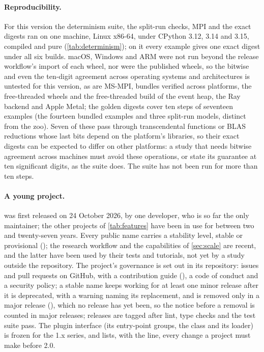 \paragraph{Reproducibility.} For this version the determinism suite, the split-run checks,
MPI and the exact digests ran on one machine, Linux x86-64, under CPython 3.12, 3.14 and
3.15, compiled and pure (\cref{tab:determinism}); on it every example gives one exact digest
under all six builds. macOS, Windows and ARM were not run beyond the release workflow's
import of each wheel, nor were the published wheels, so the bitwise and even the ten-digit
agreement across operating systems and architectures is untested for this version, as are
MS-MPI, bundles verified across platforms, the free-threaded wheels and the free-threaded
build of the event heap, the Ray backend and Apple Metal; the golden digests cover ten
steps of seventeen examples (the fourteen bundled examples and three split-run models,
distinct from the zoo). Seven of these pass through transcendental functions or BLAS
reductions whose last bits depend on the platform's libraries, so their exact digests can
be expected to differ on other platforms: a study that needs bitwise agreement across
machines must avoid these operations, or state its guarantee at ten significant digits, as
the suite does. The suite has not been run for more than ten steps.

\paragraph{A young project.} \modelly{} was first released on 24 October 2026, by one developer,
who is so far the only maintainer; the other projects of \cref{tab:features} have been in use
for between two and twenty-seven years.
Every public name carries a stability level, stable or provisional
(); the research workflow and the capabilities of
\cref{sec:scale} are recent, and the latter have been used by their tests and tutorials, not
yet by a study outside the repository. The project's governance is set out in its repository:
issues and pull requests on GitHub, with a contribution guide (), a code
of conduct and a security policy; a stable name keeps working for at least one minor release
after it is deprecated, with a warning naming its replacement, and is removed only in a major
release (), which no release has yet been, so the notice before a
removal is counted in major releases; releases are tagged after lint, type checks and the test
suite pass. The plugin interface (its entry-point groups, the  class and its
loader) is frozen for the 1.x series, and  lists, with the
line, every change a project must make before 2.0.

